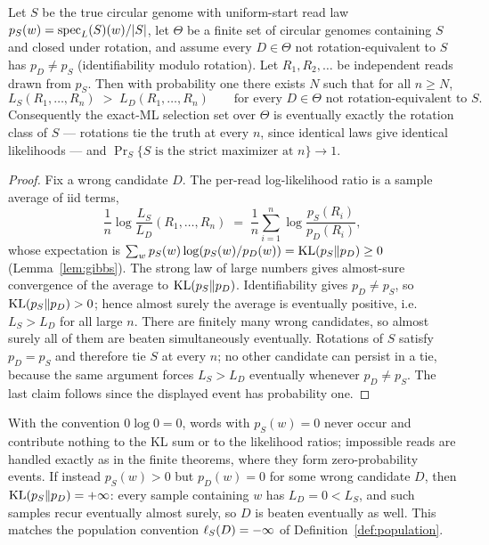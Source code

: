 \begin{proposition}
\label{prop:strong-consistency}
Let $S$ be the true circular genome with uniform-start read law
$p_S(w)=\operatorname{spec}_L(S)(w)/|S|$, let $\Theta$ be a finite set of circular genomes
containing $S$ and closed under rotation, and assume every
$D\in\Theta$ not rotation-equivalent to $S$ has $p_D\neq p_S$
(identifiability modulo rotation).
Let $R_1,R_2,\dots$ be independent reads drawn from $p_S$. Then with
probability one there exists $N$ such that for all $n\ge N$,
\[
  L_S(R_1,\dots,R_n) \;>\; L_D(R_1,\dots,R_n)
  \qquad\text{for every } D\in\Theta
  \text{ not rotation-equivalent to } S.
\]
Consequently the exact-ML selection set over $\Theta$ is eventually exactly
the rotation class of $S$ --- rotations tie the truth at every $n$, since
identical laws give identical likelihoods --- and
$\Pr_S\{\text{$S$ is the strict maximizer at $n$}\}\to 1$.
\end{proposition}

\begin{proof}
Fix a wrong candidate $D$. The per-read log-likelihood ratio is a sample
average of iid terms,
\[
  \frac1n\log\frac{L_S}{L_D}(R_1,\dots,R_n)
  \;=\;\frac1n\sum_{i=1}^n \log\frac{p_S(R_i)}{p_D(R_i)},
\]
whose expectation is
$\sum_w p_S(w)\log(p_S(w)/p_D(w))=\operatorname{KL}(p_S\|p_D)\ge0$
(Lemma~\ref{lem:gibbs}). The strong law of large numbers
gives almost-sure convergence of the average to $\operatorname{KL}(p_S\|p_D)$.
Identifiability gives $p_D\neq p_S$, so $\operatorname{KL}(p_S\|p_D)>0$; hence almost
surely the average is eventually positive, i.e.\ $L_S>L_D$ for all large
$n$. There are finitely many wrong candidates, so almost surely all of them
are beaten simultaneously eventually. Rotations of $S$ satisfy $p_D=p_S$ and
therefore tie $S$ at every $n$; no other candidate can persist in a tie,
because the same argument forces $L_S>L_D$ eventually whenever
$p_D\neq p_S$. The last claim follows since the displayed event has
probability one.
\end{proof}

\begin{remark}
\label{rem:support-convention}
With the convention $0\log 0=0$, words with $p_S(w)=0$ never occur and
contribute nothing to the KL sum or to the likelihood ratios; impossible
reads are handled exactly as in the finite theorems, where they form
zero-probability events. If instead $p_S(w)>0$ but $p_D(w)=0$ for some
wrong candidate $D$, then $\operatorname{KL}(p_S\|p_D)=+\infty$: every sample containing
$w$ has $L_D=0<L_S$, and such samples recur eventually almost surely, so
$D$ is beaten eventually as well. This matches the population convention
$\ell_S(D)=-\infty$ of Definition~\ref{def:population}.
\end{remark}

